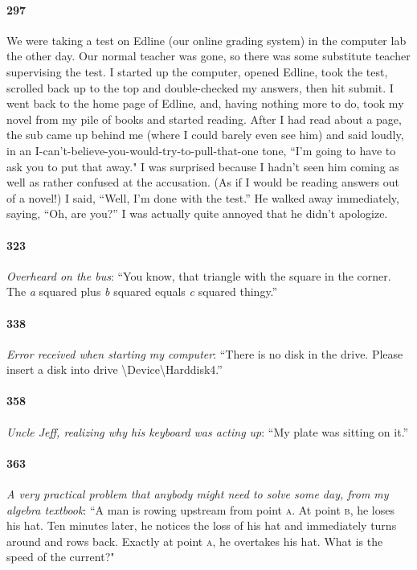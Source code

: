 \documentclass[10pt]{memoir}
\newcommand{\intro}[1]{\emph{#1}}
\begin{document}
\paragraph{297} We were taking a test on Edline (our online grading system) in the computer lab the other day. Our normal teacher was gone, so there was some substitute teacher supervising the test. I started up the computer, opened Edline, took the test, scrolled back up to the top and double-checked my answers, then hit submit. I went back to the home page of Edline, and, having nothing more to do, took my novel from my pile of books and started reading. After I had read about a page, the sub came up behind me (where I could barely even see him) and said loudly, in an I-can't-believe-you-would-try-to-pull-that-one tone, ``I'm going to have to ask you to put that away." I was surprised because I hadn't seen him coming as well as rather confused at the accusation. (As if I would be reading answers out of a novel!) I said, “Well, I'm done with the test.” He walked away immediately, saying, “Oh, are you?” I was actually quite annoyed that he didn't apologize.

\paragraph{323} \intro{Overheard on the bus}: ``You know, that triangle with the square in the corner. The \emph{a} squared plus \emph{b} squared equals \emph{c} squared thingy.''

\paragraph{338} \intro{Error received when starting my computer}: ``There is no disk in the drive. Please insert a disk into drive \textbackslash Device\textbackslash Harddisk4.''

\paragraph{358} \intro{Uncle Jeff, realizing why his keyboard was acting up}: ``My plate was sitting on it.''

\paragraph{363} \intro{A very practical problem that anybody might need to solve some day, from my algebra textbook}: ``A man is rowing upstream from point \textsc{a}. At point \textsc{b}, he loses his hat. Ten minutes later, he notices the loss of his hat and immediately turns around and rows back. Exactly at point \textsc{a}, he overtakes his hat. What is the speed of the current?" 
\end{document}
